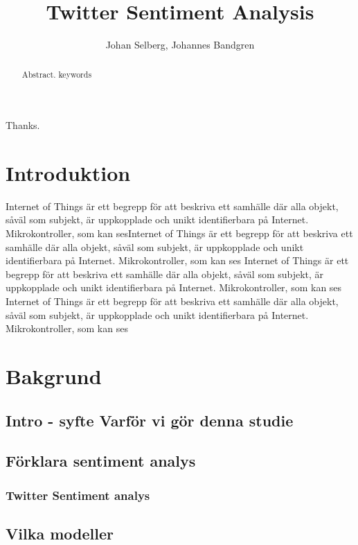 \documentclass{kaumasters} %
\title{Twitter Sentiment Analysis}
\author{Johan Selberg, Johannes Bandgren}
\institute{Department of Computer Science}
\begin{document}
\maketitle



\frontmatter
\begin{abstract}
  Abstract.
  \keywords keywords
\end{abstract}
\approvalpage%
\begin{acknowledgements}
  Thanks.
\end{acknowledgements}

\tableofcontents{}
\mainmatter


\chapter{Introduktion}
Internet of Things är ett begrepp för att beskriva ett samhälle där alla objekt, såväl som subjekt, är uppkopplade och unikt identifierbara på Internet. Mikrokontroller, som kan sesInternet of Things är ett begrepp för att beskriva ett samhälle där alla objekt, såväl som subjekt, är uppkopplade och unikt identifierbara på Internet. Mikrokontroller, som kan ses
Internet of Things är ett begrepp för att beskriva ett samhälle där alla objekt, såväl som subjekt, är uppkopplade och unikt identifierbara på Internet. Mikrokontroller, som kan ses
Internet of Things är ett begrepp för att beskriva ett samhälle där alla objekt, såväl som subjekt, är uppkopplade och unikt identifierbara på Internet. Mikrokontroller, som kan ses


\chapter{Bakgrund}
\section{Intro - syfte Varför vi gör denna studie}
\section{Förklara sentiment analys}
\subsection{Twitter Sentiment analys}
\section{Vilka modeller}
\end{document}
